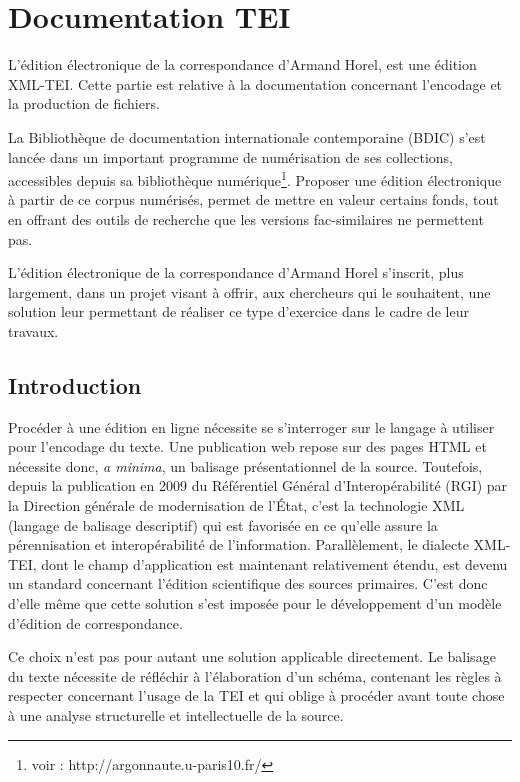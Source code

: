 \documentclass[12pt,a4paper,oneside]{book} %
\author{}
\title{}
\date{Version du \today}
\begin{document}
\part{Documentation TEI}

L'édition électronique de la correspondance d'Armand Horel, est une édition XML-TEI. Cette partie est relative à la documentation concernant l'encodage et la production de fichiers.

La Bibliothèque de documentation internationale contemporaine (BDIC) s'est lancée dans un important programme de numérisation de ses collections, accessibles depuis sa bibliothèque numérique\footnote{voir : http://argonnaute.u-paris10.fr/}. 
Proposer  une édition électronique à partir de ce corpus numérisés, permet de mettre en valeur certains fonds, tout en offrant des outils de recherche que les versions fac-similaires ne permettent pas.

L'édition électronique de la correspondance d'Armand Horel s'inscrit, plus largement, dans un projet visant à offrir, aux chercheurs qui le souhaitent, une solution leur permettant de réaliser ce type d'exercice dans le cadre de leur travaux.

\chapter{Introduction}

Procéder à une édition en ligne nécessite se s'interroger sur le langage à utiliser pour l'encodage du texte. Une publication web repose sur des pages HTML et nécessite donc, \textit{a minima}, un balisage présentationnel de la source. Toutefois, depuis la publication en 2009 du Référentiel Général d'Interopérabilité (RGI) par la Direction générale de modernisation de l'État, c'est la technologie XML (langage de balisage descriptif) qui est favorisée en ce qu'elle assure la pérennisation et interopérabilité de l'information. Parallèlement, le dialecte XML-TEI, dont le champ d'application est maintenant relativement étendu, est devenu un standard concernant l'édition scientifique des sources primaires. C'est donc d'elle même que cette solution s'est imposée pour le développement d'un modèle d'édition de correspondance.  
\bigskip 

Ce choix n'est pas pour autant une solution applicable directement. Le balisage du texte nécessite de réfléchir à l'élaboration d'un schéma, contenant les règles à respecter concernant l'usage de la TEI et qui oblige à procéder avant toute chose à une analyse structurelle et intellectuelle de la source.
\end{document}
